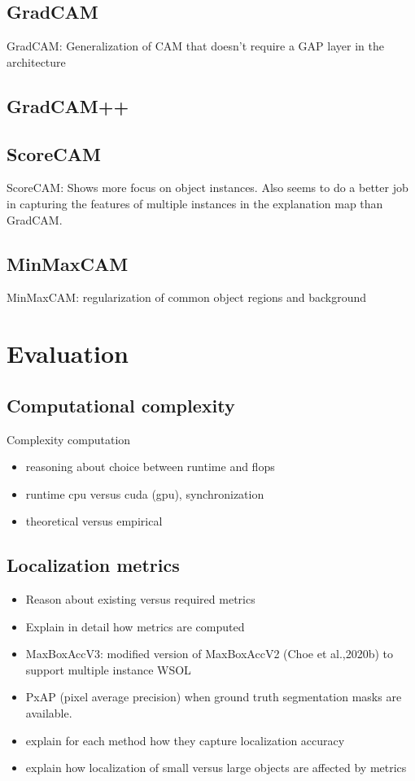 \subsection{GradCAM}
GradCAM: Generalization of CAM that doesn’t require a GAP layer in the architecture

\subsection{GradCAM++}

\subsection{ScoreCAM}
ScoreCAM: Shows more focus on object instances. Also seems to do a better job in capturing the features of multiple instances in the explanation map than GradCAM.

\subsection{MinMaxCAM}
MinMaxCAM: regularization of common object regions and background

\section{Evaluation}
\subsection{Computational complexity}
Complexity computation
\begin{itemize}
    \item reasoning about choice between runtime and flops
    \item runtime cpu versus cuda (gpu), synchronization
    \item theoretical versus empirical
\end{itemize}

\subsection{Localization metrics}
\begin{itemize}
    \item Reason about existing versus required metrics
    \item Explain in detail how metrics are computed
    \item MaxBoxAccV3: modified version of MaxBoxAccV2 (Choe et al.,2020b) to support multiple instance WSOL
    \item PxAP (pixel average precision) when ground truth segmentation masks are available.
    \item explain for each method how they capture localization accuracy
    \item explain how localization of small versus large objects are affected by metrics
\end{itemize}


